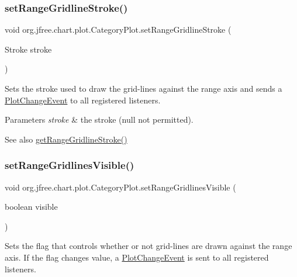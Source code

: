 \subsubsection{\texorpdfstring{set\+Range\+Gridline\+Stroke()}{setRangeGridlineStroke()}}
{\footnotesize\ttfamily void org.\+jfree.\+chart.\+plot.\+Category\+Plot.\+set\+Range\+Gridline\+Stroke (\begin{DoxyParamCaption}\item[{Stroke}]{stroke }\end{DoxyParamCaption})}

Sets the stroke used to draw the grid-\/lines against the range axis and sends a \mbox{\hyperlink{}{Plot\+Change\+Event}} to all registered listeners.


\begin{DoxyParams}{Parameters}
{\em stroke} & the stroke ({\ttfamily null} not permitted).\\
\hline
\end{DoxyParams}
\begin{DoxySeeAlso}{See also}
\mbox{\hyperlink{classorg_1_1jfree_1_1chart_1_1plot_1_1_category_plot_ae6769196c3c8bad1d58e293103ccc3ea}{get\+Range\+Gridline\+Stroke()}} 
\end{DoxySeeAlso}
\mbox{\label{classorg_1_1jfree_1_1chart_1_1plot_1_1_category_plot_a7430d1f431ac052d95edf4f6b516aea7}} 
\subsubsection{\texorpdfstring{set\+Range\+Gridlines\+Visible()}{setRangeGridlinesVisible()}}
{\footnotesize\ttfamily void org.\+jfree.\+chart.\+plot.\+Category\+Plot.\+set\+Range\+Gridlines\+Visible (\begin{DoxyParamCaption}\item[{boolean}]{visible }\end{DoxyParamCaption})}

Sets the flag that controls whether or not grid-\/lines are drawn against the range axis. If the flag changes value, a \mbox{\hyperlink{}{Plot\+Change\+Event}} is sent to all registered listeners.


